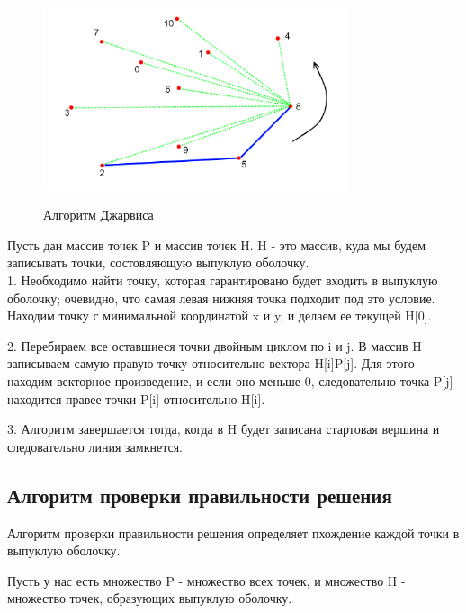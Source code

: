 \documentclass[a4paper, 12pt]{article}
\begin{document}
\begin{figure}[h!]
    \centering
    \includegraphics[width=0.8\textwidth]{images/jarvis.png}\\[5mm]
    \caption{Алгоритм Джарвиса}
    \label{fig:project}
\end{figure}

Пусть дан массив точек {P} и массив точек {H}. {H} - это массив, куда мы будем записывать точки, состовляющую выпуклую оболочку.\\[2mm]

1. Необходимо найти точку, которая гарантировано будет входить в выпуклую оболочку; очевидно, что самая левая нижняя точка подходит под это условие. Находим точку с минимальной координатой {x} и {y}, и делаем ее текущей {H[0]}.

2. Перебираем все оставшиеся точки двойным циклом по {i} и {j}. В массив H записываем самую правую точку относительно вектора {H[i]P[j]}. Для этого находим векторное произведение, и если оно меньше 0, следовательно точка {P[j]} находится правее точки {P[i]} относительно {H[i]}.

3. Алгоритм завершается тогда, когда в {H} будет записана стартовая вершина и следовательно линия замкнется.

\begin{center}
    \subsection{Алгоритм проверки правильности решения}
\end{center}

Алгоритм проверки правильности решения определяет пхождение каждой точки в выпуклую оболочку.

Пусть у нас есть множество {P} - множество всех точек, и множество {H} - множество точек, образующих выпуклую оболочку.\\[2mm]
\end{document}

